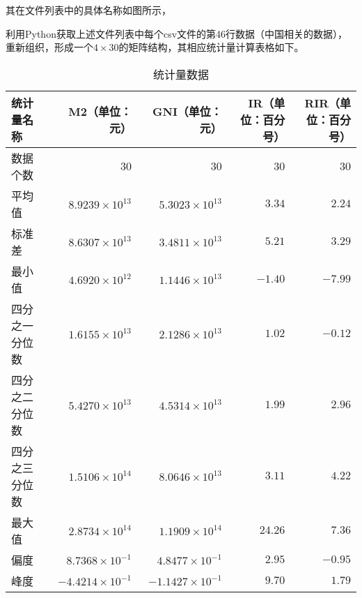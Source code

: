 其在文件列表中的具体名称如图所示，



利用Python获取上述文件列表中每个csv文件的第46行数据（中国相关的数据），重新组织，形成一个$4 \times 30$的矩阵结构，其相应统计量计算表格如下。

\begin{table}[htbp]
	\centering
	\caption{统计量数据}
	\footnotesize %
	\begin{tabular}{@{}lrrrr@{}}
		\toprule
		统计量名称 & M2（单位：元） & GNI（单位：元） & IR（单位：百分号） & RIR（单位：百分号） \\ \midrule
		数据个数 & 30 & 30 & 30 & 30 \\
		平均值 & $8.9239 \times 10^{13}$ & $5.3023 \times 10^{13}$ & $3.34$ & $2.24$ \\
		标准差 & $8.6307 \times 10^{13}$ & $3.4811 \times 10^{13}$ & $5.21$ & $3.29$ \\
		最小值 & $4.6920 \times 10^{12}$ & $1.1446 \times 10^{13}$ & $-1.40$ & $-7.99$ \\
		四分之一分位数 & $1.6155 \times 10^{13}$ & $2.1286 \times 10^{13}$ & $1.02$ & $-0.12$ \\
		四分之二分位数 & $5.4270 \times 10^{13}$ & $4.5314 \times 10^{13}$ & $1.99$ & $2.96$ \\
		四分之三分位数 & $1.5106 \times 10^{14}$ & $8.0646 \times 10^{13}$ & $3.11$ & $4.22$ \\
		最大值 & $2.8734 \times 10^{14}$ & $1.1909 \times 10^{14}$ & $24.26$ & $7.36$ \\
		偏度 & $8.7368 \times 10^{-1}$ & $4.8477 \times 10^{-1}$ & $2.95$ & $-0.95$ \\
		峰度 & $-4.4214 \times 10^{-1}$ & $-1.1427 \times 10^{-1}$ & $9.70$ & $1.79$ \\ 
		\bottomrule
	\end{tabular}
	\label{tab:statistics}
\end{table}

